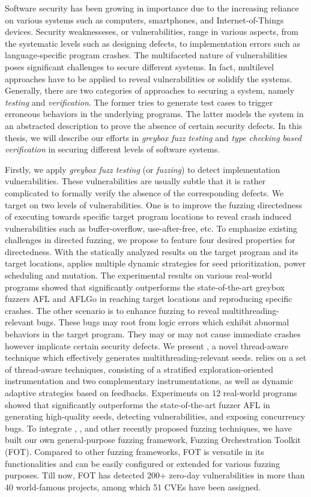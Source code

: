 Software security has been growing in importance due to the increasing reliance on various systems such as computers, smartphones, and Internet-of-Things devices. Security weaknesseses, or vulnerabilities, range in various aspects, from the systematic levels such as designing defects, to implementation errors such as language-specific program crashes. The multifaceted nature of vulnerabilities poses significant challenges to secure different systems. In fact, multilevel approaches have to be applied to reveal vulnerabilities or solidify the systems. Generally, there are two categories of approaches to securing a system, namely \emph{testing} and \emph{verification}. The former tries to generate test cases to trigger erroneous behaviors in the underlying programs. The latter models the system in an abstracted description to prove the absence of certain security defects.
  In this thesis, we will describe our efforts in \emph{greybox fuzz testing} and \emph{type checking based verification} in securing different levels of software systems.

Firstly, we apply \emph{greybox fuzz testing} (or \emph{fuzzing}) to detect implementation vulnerabilities. These vulnerabilities are usually subtle that it is rather complicated to formally verify the absence of the corresponding defects. We target on two levels of vulnerabilities.
One is to improve the fuzzing directedness of executing towards specific target program locations to reveal crash induced vulnerabilities such as buffer-overflow, use-after-free, etc. To emphasize existing challenges in \mbox{directed} fuzzing, we propose \dFOT to feature four desired properties for directedness. With the statically analyzed results on the target program and its target locations, \dFOT applies multiple dynamic strategies for seed prioritization, power scheduling and \mbox{mutation}. The experimental results on various real-world \mbox{programs} showed that \dFOT significantly outperforms the state-of-the-art greybox fuzzers AFL and AFLGo in reaching target locations and reproducing specific crashes.
The other scenario is to enhance fuzzing to reveal multithreading-relevant bugs. These bugs may root from logic errors which exhibit abnormal behaviors in the target program. They may or may not cause immediate crashes however implicate certain security defects. We present \mtfuzz, a novel thread-aware technique which effectively generates multithreading-relevant seeds. \mtfuzz relies on a set of thread-aware techniques, consisting of a stratified exploration-oriented instrumentation and two complementary instrumentations, as well as dynamic adaptive strategies based on feedbacks. Experiments on 12 real-world programs showed that \mtfuzz significantly outperforms the state-of-the-art fuzzer AFL in generating high-quality seeds, detecting vulnerabilities, and exposing concurrency bugs.
To integrate \dFOT, \mtfuzz, and other recently proposed fuzzing techniques, we have built our own general-purpose fuzzing framework, Fuzzing Orchestration Toolkit (FOT). Compared to other fuzzing frameworks, FOT is versatile in its functionalities and can be easily configured or extended for various fuzzing purposes. Till now, FOT has detected 200+ zero-day vulnerabilities in more than 40 world-famous projects, among which 51 CVEs have been assigned.

